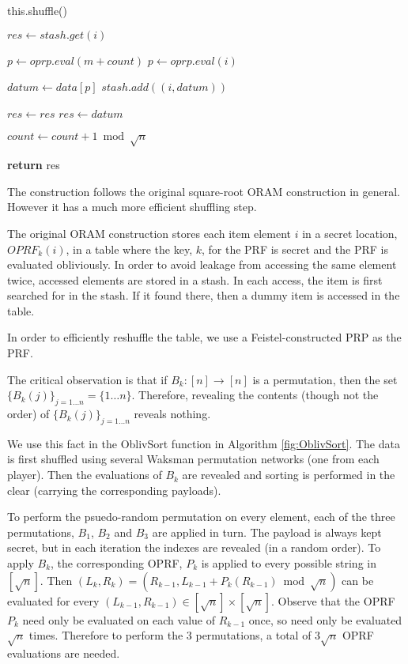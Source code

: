 \begin{algorithm}
\begin{algorithmic}[1]


    \State this.shuffle()
\EndIf

\State $res \gets stash.get(i)$

    \State $p \gets oprp.eval(m + count)$
\Else
    \State $p \gets oprp.eval(i)$
\EndIf

\State $datum \gets data[p]$
\State $stash.add((i, datum))$

    \State $res \gets res$
\Else
    \State $res \gets datum$
\EndIf

\State $count \gets count + 1 \bmod \sqrt{n}$ 

\State \textbf{return} res
\EndProcedure

\end{algorithmic}
\end{algorithm}


The construction follows the original square-root ORAM construction
\cite{ostrovsky1997private} in general. 
However it has a much more efficient shuffling step.

The original ORAM construction stores each item element $i$
in a secret location, $OPRF_k(i)$, in a table where
the key, $k$, for the PRF is secret and the PRF is evaluated obliviously.
In order to avoid leakage from accessing the same element twice,
accessed elements are stored in a stash. 
In each access, the item is first searched for in the stash.
If it found there, then a dummy item is accessed in the table.

In order to efficiently reshuffle the table, we use a Feistel-constructed
PRP as the PRF.

The critical observation is that if $B_k : [n] \rightarrow [n]$ is a permutation, 
then the set $\{B_k(j) \}_{j=1 \ldots n} = \{1 \ldots n\}$.
Therefore, revealing the contents (though not the order) of
$\{B_k(j)\}_{j=1 \ldots n}$ reveals nothing.

We use this fact in the OblivSort function in Algorithm \ref{fig:OblivSort}.
The data is first shuffled using several Waksman permutation networks
(one from each player).
Then the evaluations of $B_k$ are revealed and sorting is performed in the clear
(carrying the corresponding payloads).

To perform the psuedo-random permutation on every element, 
each of the three permutations, $B_1$, $B_2$ and $B_3$ are applied in turn.
The payload is always kept secret, 
but in each iteration the indexes are revealed (in a random order).
To apply $B_k$, the corresponding OPRF, $P_k$ is applied to every possible string
in $[\sqrt{n}]$. 
Then $(L_k, R_k) = (R_{k-1}, L_{k-1} + P_k(R_{k-1}) \bmod \sqrt{n})$ can 
be evaluated for every $(L_{k-1}, R_{k-1}) \in [\sqrt{n}] \times [\sqrt{n}]$.
Observe that the OPRF $P_k$ need only be evaluated on each value of
$R_{k-1}$ once, so need only be evaluated $\sqrt{n}$ times.
Therefore to perform the 3 permutations, a total of $3 \sqrt{n}$ OPRF
evaluations are needed.



